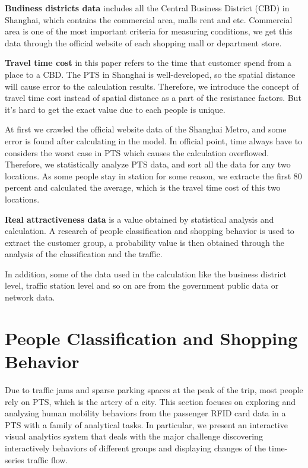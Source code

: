 \documentclass[journal,transmag]{IEEEtran}
\begin{document}
\textbf{Budiness districts data} includes all the Central Business District (CBD) in Shanghai, which contains the commercial area, malls rent and etc. Commercial area is one of the most important criteria for measuring conditions, we get this data through the official website of each shopping mall or department store.

\textbf{Travel time cost} in this paper refers to the time that customer spend from a place to a CBD. The PTS in Shanghai is well-developed, so the spatial distance will cause error to the calculation results. Therefore, we introduce the concept of travel time cost instead of spatial distance as a part of the resistance factors. But it's hard to get the exact value due to each people is unique.

At first we crawled the official website data of the Shanghai Metro, and some error is found after calculating in the model. In official point, time always have to considers the worst case in PTS which causes the calculation overflowed. Therefore, we statistically analyze PTS data, and sort all the data for any two locations. As some people stay in station for some reason, we extracte the first 80 percent and calculated the average, which is the travel time cost of this two locations.

\textbf{Real attractiveness data} is a value obtained by statistical analysis and calculation. A research of people classification and shopping behavior is used to extract the customer group, a probability value is then obtained through the analysis of the classification and the traffic.

In addition, some of the data used in the calculation like the business district level, traffic station level and so on are from the government public data or network data.









\section{People Classification and Shopping Behavior}

Due to traffic jams and sparse parking spaces at the peak of the trip, most people rely on PTS, which is the artery of a city. This section focuses on exploring and analyzing human mobility behaviors from the passenger RFID card data in a PTS with a family of analytical tasks. In particular, we present an interactive visual analytics system that deals with the major challenge discovering interactively behaviors of different groups and displaying changes of the time-series traffic flow. 
\end{document}
